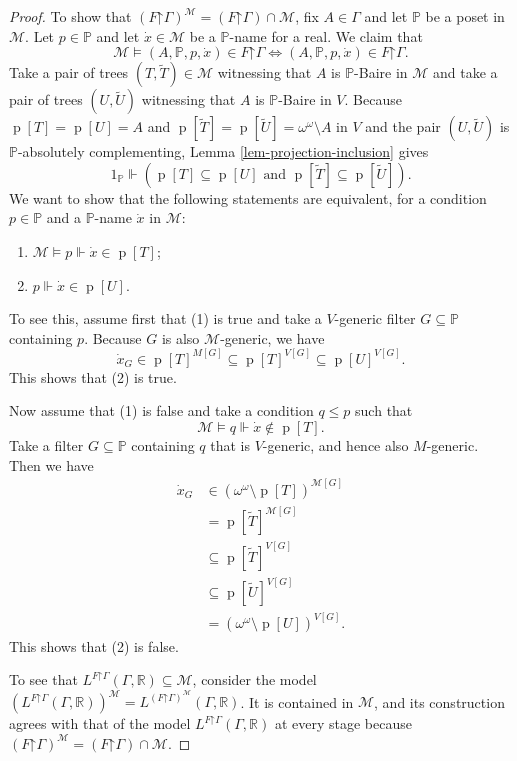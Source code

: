\documentclass[fleqn, 11pt]{amsart}
\theoremstyle{plain}
\theoremstyle{definition}
\theoremstyle{remark}
\newcommand{\forces}{\mathbin{\Vdash}}
\newcommand{\restrict}{\mathord{\restriction}}
\DeclareMathOperator{\p}{p}
\begin{document}
\begin{proof}
To show that $(F \restrict \Gamma)^\mathcal{M} = (F \restrict \Gamma) \cap \mathcal{M}$, fix $A \in \Gamma$ and let $\mathbb{P}$ be a poset in $\mathcal{M}$.
Let $p \in \mathbb{P}$ and let $\dot{x} \in \mathcal{M}$ be a $\mathbb{P}$-name for a real.
We claim that
\[ 
\mathcal{M} \models (A, \mathbb{P}, p, \dot{x}) \in F \restrict \Gamma
\iff 
(A, \mathbb{P}, p, \dot{x}) \in F \restrict \Gamma.\]
Take a pair of trees $(T, \tilde{T}) \in \mathcal{M}$ witnessing that $A$ is $\mathbb{P}$-Baire in $\mathcal{M}$ and take a pair of trees $(U,\tilde{U})$ witnessing that $A$ is $\mathbb{P}$-Baire in $V$.
Because $\p[T] = \p[U] = A$ and $\p[\tilde{T}] = \p[\tilde{U}] = \omega^\omega \setminus A$ in $V$ and the pair $(U,\tilde{U})$ is $\mathbb{P}$-absolutely complementing, Lemma \ref{lem-projection-inclusion} gives
\[ 1_{\mathbb{P}} \forces (\p[T] \subseteq \p[U] \text{ and } \p[\tilde{T}] \subseteq \p[\tilde{U}]).\]
We want to show that the following statements are equivalent, for a condition $p \in \mathbb{P}$ and a $\mathbb{P}$-name $\dot{x}$ in $\mathcal{M}$:
\begin{enumerate}
 \item $\mathcal{M} \models p \forces \dot{x} \in \p[T]$; 
 \item $p \forces \dot{x} \in \p[U]$.
\end{enumerate}
To see this, assume first that (1) is true and take a $V$-generic filter $G \subseteq \mathbb{P}$ containing $p$.  Because $G$ is also $\mathcal{M}$-generic, we have
\[\dot{x}_G \in \p[T]^{M[G]} \subseteq \p[T]^{V[G]} \subseteq \p[U]^{V[G]}.\]
This shows that (2) is true.

Now assume that (1) is false and take a condition $q \le p$ such that
\[\mathcal{M} \models q \forces \dot{x} \notin \p[T].\]
Take a filter $G \subseteq \mathbb{P}$ containing $q$ that is $V$-generic, and hence also $M$-generic.
Then we have
\begin{align*}
 \dot{x}_G &\in (\omega^\omega \setminus \p[T])^{\mathcal{M}[G]}\\
 &= \p[\tilde{T}]^{\mathcal{M}[G]}\\
 &\subseteq \p[\tilde{T}]^{V[G]}\\
 &\subseteq \p[\tilde{U}]^{V[G]}\\
 &= (\omega^\omega \setminus \p[U])^{V[G]}.
\end{align*}
This shows that (2) is false.

To see that $L^{F \restrict \Gamma}(\Gamma, \mathbb{R}) \subseteq \mathcal{M}$, consider the model
$(L^{F \restrict \Gamma}(\Gamma, \mathbb{R}))^\mathcal{M} = L^{(F \restrict \Gamma)^\mathcal{M}}(\Gamma, \mathbb{R})$.  It is contained in $\mathcal{M}$, and its construction agrees with that of the model $L^{F \restrict \Gamma}(\Gamma, \mathbb{R})$
at every stage because $(F \restrict \Gamma)^\mathcal{M} = (F \restrict \Gamma) \cap \mathcal{M}$.
\end{proof}
\end{document}
